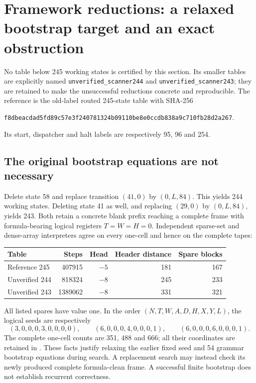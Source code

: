 \section{Framework reductions: a relaxed bootstrap target and an exact obstruction}
\label{sec:framework-findings}

No table below 245 working states is certified by this section.  Its smaller
tables are explicitly named \texttt{unverified\_scanner244} and
\texttt{unverified\_scanner243}; they are retained to make the unsuccessful
reductions concrete and reproducible.  The reference is the old-label routed
245-state table with SHA-256
\begin{center}\small
\texttt{f8dbeacdad5fd89c57e3f240781324b09110be8e0ccdb838a9c710fb28d2a267}.
\end{center}
Its start, dispatcher and halt labels are respectively 95, 96 and 254.

\subsection{The original bootstrap equations are not necessary}

Delete state 58 and replace transition $(41,0)$ by $(0,L,84)$.  This yields
244 working states.  Deleting state 41 as well, and replacing $(29,0)$ by
$(0,L,84)$, yields 243.  Both retain a concrete blank prefix reaching a
complete frame with formula-bearing logical registers $T=W=H=0$.
Independent sparse-set and dense-array interpreters agree on every one-cell
and hence on the complete tapes:
\begin{center}\small
\begin{tabular}{lrrrr}
Table & Steps & Head & Header distance & Spare blocks\\\hline
Reference 245 & 407915 & $-5$ & 181 & 167\\
Unverified 244 & 818324 & $-8$ & 245 & 233\\
Unverified 243 & 1389062 & $-8$ & 331 & 321
\end{tabular}
\end{center}
All listed spares have value one.  In the order $(N,T,W,A,D,H,X,Y,L)$, the
logical seeds are respectively
\[
(3,0,0,0,3,0,0,0,0),\qquad
(6,0,0,0,4,0,0,0,1),\qquad
(6,0,0,0,6,0,0,0,1).
\]
The complete one-cell counts are 351, 488 and 666; all their coordinates are
retained in .
These facts justify relaxing the earlier fixed seed and 54 grammar
bootstrap equations during search.  A replacement search may instead check
its newly produced complete formula-clean frame.  A successful finite
bootstrap does not establish recurrent correctness.

